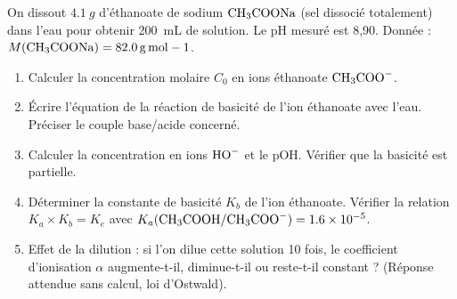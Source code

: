 \documentclass[11pt]{article}
\begin{document}
\begin{exercice}
On dissout $\SI{4,1}{g}$ d'éthanoate de sodium $\ce{CH3COONa}$ (sel dissocié totalement) dans l'eau pour obtenir \SI{200}{mL} de solution. Le pH mesuré est 8,90. Donnée : $M(\ce{CH3COONa}) = \SI{82,0}{g.mol-1}$.
\begin{enumerate}
    \item Calculer la concentration molaire $C_0$ en ions éthanoate $\ce{CH3COO-}$.
    \item Écrire l'équation de la réaction de basicité de l'ion éthanoate avec l'eau. Préciser le couple base/acide concerné.
    \item Calculer la concentration en ions $\ce{HO-}$ et le pOH. Vérifier que la basicité est partielle.
    \item Déterminer la constante de basicité $K_b$ de l'ion éthanoate. Vérifier la relation $K_a \times K_b = K_e$ avec $K_a(\ce{CH3COOH/CH3COO-}) = \SI{1,6e-5}{}$.
    \item Effet de la dilution : si l'on dilue cette solution 10 fois, le coefficient d'ionisation $\alpha$ augmente-t-il, diminue-t-il ou reste-t-il constant ? (Réponse attendue sans calcul, loi d'Ostwald).
\end{enumerate}
\end{exercice}
\end{document}
